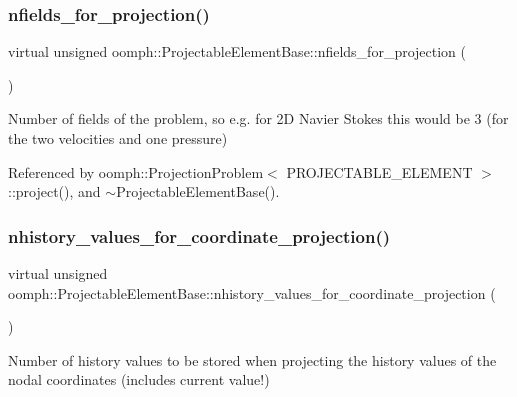 \subsubsection{\texorpdfstring{nfields\+\_\+for\+\_\+projection()}{nfields\_for\_projection()}}
{\footnotesize\ttfamily virtual unsigned oomph\+::\+Projectable\+Element\+Base\+::nfields\+\_\+for\+\_\+projection (\begin{DoxyParamCaption}{ }\end{DoxyParamCaption})\hspace{0.3cm}{\ttfamily [pure virtual]}}



Number of fields of the problem, so e.\+g. for 2D Navier Stokes this would be 3 (for the two velocities and one pressure) 



Referenced by oomph\+::\+Projection\+Problem$<$ P\+R\+O\+J\+E\+C\+T\+A\+B\+L\+E\+\_\+\+E\+L\+E\+M\+E\+N\+T $>$\+::project(), and $\sim$\+Projectable\+Element\+Base().

\mbox{\label{classoomph_1_1ProjectableElementBase_ab4ecd0cd24000a3ed675dc7198203c1f}} 
\subsubsection{\texorpdfstring{nhistory\+\_\+values\+\_\+for\+\_\+coordinate\+\_\+projection()}{nhistory\_values\_for\_coordinate\_projection()}}
{\footnotesize\ttfamily virtual unsigned oomph\+::\+Projectable\+Element\+Base\+::nhistory\+\_\+values\+\_\+for\+\_\+coordinate\+\_\+projection (\begin{DoxyParamCaption}{ }\end{DoxyParamCaption})\hspace{0.3cm}{\ttfamily [pure virtual]}}



Number of history values to be stored when projecting the history values of the nodal coordinates (includes current value!) 



